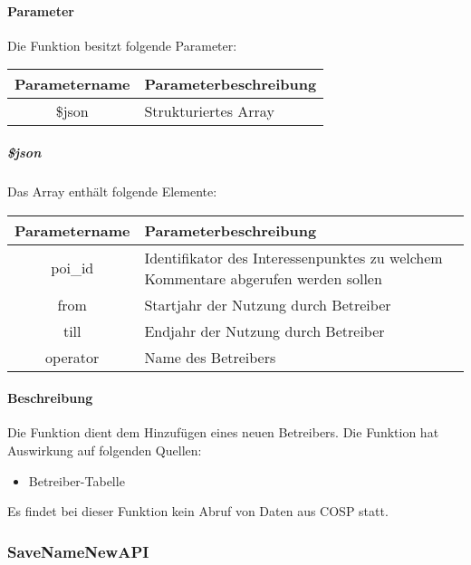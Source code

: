 \paragraph{Parameter} Die Funktion besitzt folgende Parameter:
\begin{table}[H]
	\begin{tabular}{|c|p{11cm}|}
		\hline
		\textbf{Parametername} & \textbf{Parameterbeschreibung} \\ \hline
		\$json & Strukturiertes Array \\ \hline
	\end{tabular}
\end{table}
\subparagraph{\$json}Das Array enthält folgende Elemente:
\begin{table}[H]
	\begin{tabular}{|c|p{11cm}|}
		\hline
		\textbf{Parametername} & \textbf{Parameterbeschreibung} \\ \hline
		poi\_id & Identifikator des Interessenpunktes zu welchem Kommentare abgerufen werden sollen \\ \hline
		from & Startjahr der Nutzung durch Betreiber \\ \hline
		till & Endjahr der Nutzung durch Betreiber \\ \hline
		operator & Name des Betreibers \\ \hline
	\end{tabular}
\end{table}
\paragraph{Beschreibung} Die Funktion dient dem Hinzufügen eines neuen Betreibers. Die Funktion hat Auswirkung auf folgenden Quellen:
\begin{itemize}
	\item Betreiber-Tabelle
\end{itemize}
Es findet bei dieser Funktion kein Abruf von Daten aus {\glqq COSP\grqq} statt.
\subsubsection{SaveNameNewAPI}
